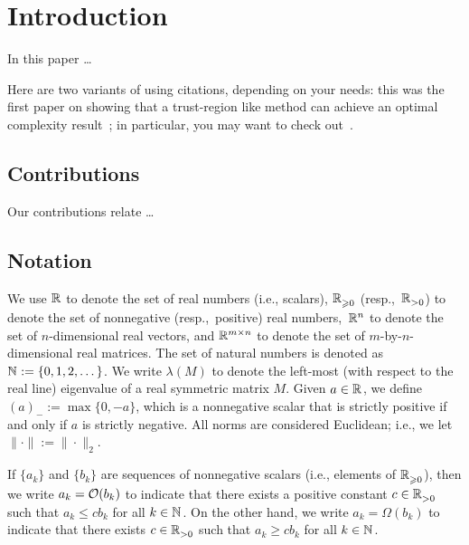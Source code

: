 

\section{Introduction}\label{sec.introduction}

In this paper \dots

Here are two variants of using citations, depending on your needs: this was the first paper on showing that a trust-region like method can achieve an optimal complexity result~\cite{CurtRobiSama17}; in particular, you may want to check out~\cite[Theorem~3.28]{CurtRobiSama17}.

\subsection{Contributions}

Our contributions relate \dots

\subsection{Notation}

We use $\mathbb{R}^{}$ to denote the set of real numbers (i.e., scalars), $\mathbb{R}^{}_{\geqslant0}$ (resp.,~$\mathbb{R}^{}_{>0}$) to denote the set of nonnegative (resp.,~positive) real numbers,~$\mathbb{R}^{n}$ to denote the set of $n$-dimensional real vectors, and $\mathbb{R}^{m \times n}$ to denote the set of $m$-by-$n$-dimensional real matrices.  The set of natural numbers is denoted as $\mathbb{N}^{} := \{0,1,2,\dots\}$.  We write $\lambda(M)$ to denote the left-most (with respect to the real line) eigenvalue of a real symmetric matrix $M$.  Given $a \in \mathbb{R}^{}$, we define $(a)_- := \max\{0,-a\}$, which is a nonnegative scalar that is strictly positive if and only if $a$ is strictly negative.  All norms are considered Euclidean; i.e., we let $\|\cdot\| := \|\cdot\|_2$.

If $\{a_k\}$ and $\{b_k\}$ are sequences of nonnegative scalars (i.e., elements of $\mathbb{R}^{}_{\geqslant0}$), then we write $a_k = \Ocal(b_k)$ to indicate that there exists a positive constant $c \in \mathbb{R}^{}_{>0}$ such that $a_k \leq cb_k$ for all $k \in \mathbb{N}^{}$.  On the other hand, we write $a_k = \Omega(b_k)$ to indicate that there exists $c \in \mathbb{R}^{}_{>0}$ such that $a_k \geq cb_k$ for all $k \in \mathbb{N}^{}$.

